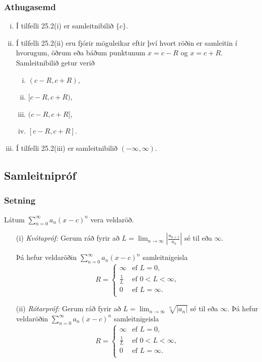 \documentclass[icelandic,a4paper,12pt]{article}
\begin{document}
\subsubsection{Athugasemd}
\begin{enumerate}[(i)]
\item Í tilfelli 25.2(i) er samleitnibilið $\{c\}$.
\item Í tilfelli 25.2(ii) eru fjórir möguleikar eftir því hvort röðin er
samleitin í hvorugum, öðrum eða báðum punktunum $x=c-R$ og $x=c+R$.  
Samleitnibilið getur verið 
\begin{enumerate}[(i)]
\item $(c-R, c+R)$,
\item $[c-R, c+R)$,
\item $(c-R, c+R]$,  
\item $[c-R, c+R]$.
\end{enumerate}
\item Í tilfelli 25.2(iii) er samleitnibilið $(-\infty, \infty)$.
\end{enumerate}

\subsection{Samleitnipróf}
\subsubsection{Setning}  
Látum $\sum_{n=0}^\infty a_n(x-c)^n$ vera veldaröð.
\begin{enumerate}[(i)]
\item[(i)]  \emph{Kvótapróf:}  Gerum ráð fyrir að 
$L=\lim_{n\rightarrow\infty}\left|\frac{a_{n+1}}{a_n}\right|$ sé til
eða $\infty$.  

Þá hefur veldaröðin  $\sum_{n=0}^\infty a_n(x-c)^n$ samleitnigeisla 
$$R= \left\{\begin{array}{ll}
\infty & \mbox{ef }L=0,\\
\frac{1}{L} & \mbox{ef }0<L<\infty,\\
0 & \mbox{ef }L=\infty.\\ 
\end{array} \right.
$$
\item[(ii)]  \emph{Rótarpróf:}  Gerum ráð fyrir að 
$L=\lim_{n\rightarrow\infty}\sqrt[n]{|a_n|}$ sé til
eða $\infty$.  
Þá hefur veldaröðin  $\sum_{n=0}^\infty a_n(x-c)^n$
samleitnigeisla 
$$R= \left\{\begin{array}{ll}
\infty & \mbox{ef }L=0,\\
\frac{1}{L} & \mbox{ef }0<L<\infty,\\
0 & \mbox{ef }L=\infty.\\
\end{array}
\right.
$$
\end{enumerate}
\end{document}
